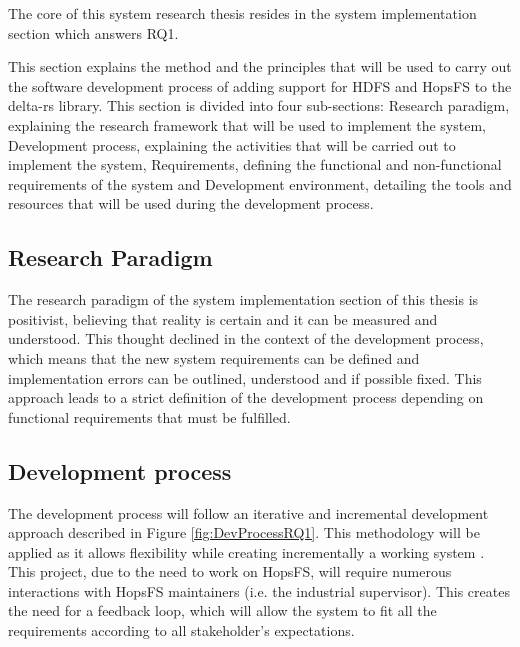 The core of this system research thesis resides in the system implementation section which answers RQ1.

This section explains the method and the principles that will be used to carry out the software development process of adding support for \gls{HDFS} and \gls{HopsFS} to the delta-rs library. This section is divided into four sub-sections: Research paradigm, explaining the research framework that will be used to implement the system, Development process, explaining the activities that will be carried out to implement the system, Requirements, defining the functional and non-functional requirements of the system and Development environment, detailing the tools and resources that will be used during the development process.

\subsection{Research Paradigm}
The research paradigm of the system implementation section of this thesis is positivist, believing that reality is certain and it can be measured and understood. This thought declined in the context of the development process, which means that the new system requirements can be defined and implementation errors can be outlined, understood and if possible fixed. This approach leads to a strict definition of the development process depending on functional requirements that must be fulfilled.

\subsection{Development process}
\label{subsec:dev_process}
The development process will follow an iterative and incremental development approach described in Figure \ref{fig:DevProcessRQ1}. This methodology will be applied as it allows flexibility while creating incrementally a working system \cite{despa2014comparative}. This project, due to the need to work on \gls{HopsFS}, will require numerous interactions with \gls{HopsFS} maintainers (i.e. the industrial supervisor). This creates the need for a feedback loop, which will allow the system to fit all the requirements according to all stakeholder's expectations.

